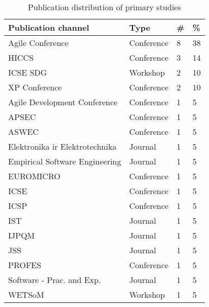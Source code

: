 \documentclass{sig-alternate}
\begin{document}
\begin{table}
\centering
\caption{Publication distribution of primary studies}
\label{PublicationDistribution}
\begin{tabular}{llll}
\hline Publication channel & Type & \# & \%\\
\hline Agile Conference & Conference & 8 & 38\\
HICCS & Conference & 3 & 14\\
ICSE SDG & Workshop & 2 & 10\\
XP Conference & Conference & 2 & 10\\
Agile Development Conference & Conference & 1 & 5\\
APSEC & Conference & 1 & 5\\
ASWEC & Conference & 1 & 5\\
Elektronika ir Elektrotechnika & Journal & 1 & 5\\
Empirical Software Engineering & Journal & 1 & 5\\
EUROMICRO & Conference & 1 & 5\\
ICSE & Conference & 1 & 5\\
ICSP & Conference & 1 & 5\\
IST & Journal & 1 & 5\\
IJPQM & Journal & 1 & 5\\
JSS & Journal & 1 & 5\\
PROFES & Conference & 1 & 5\\
Software - Prac. and Exp. & Journal & 1 & 5\\
WETSoM & Workshop & 1 & 5\\
\hline

\end{tabular}
\end{table}

\begin{comment}
\begin{table}[htbp]
  \centering
  \caption{Distribution of research methods}
    \begin{tabular}{rr}
    \toprule
    Research method & Amount \\
    \midrule
    Multicase & 2 \\
    Experience report & 7 \\
    Singlecase & 19 \\
    Survey & 1 \\
    \bottomrule
    \end{tabular}%
  \label{tab:ResearchMethods}%
\end{table}%
\end{comment}
\end{document}
